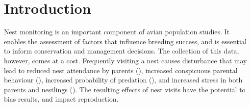 \section{Introduction}
















Nest monitoring is an important component of avian population studies.
It enables the assessment of factors that influence breeding success, and is essential to inform conservation and management decisions.
The collection of this data, however, comes at a cost.
Frequently visiting a nest causes disturbance that may lead to reduced nest attendance by parents (), increased conspicuous parental behaviour (), increased probability of predation (), and increased stress in both parents and nestlings ().
The resulting effects of nest visits have the potential to bias results, and impact reproduction.

 
 
 
 
